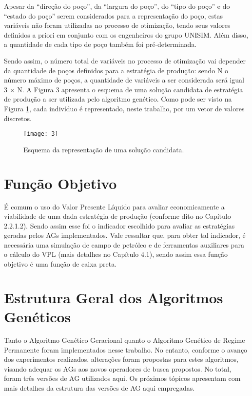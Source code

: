 Apesar da “direção do poço”, da “largura do poço”, do “tipo do poço” e do “estado do poço” serem considerados para a representação do poço, estas variáveis não foram utilizadas no processo de otimização, tendo seus valores definidos a priori em conjunto com os engenheiros do grupo UNISIM. Além disso, a quantidade de cada tipo de poço também foi pré-determinada. 

Sendo assim, o número total de variáveis no processo de otimização vai depender da quantidade de poços definidos para a estratégia de produção: sendo N o número máximo de poços, a quantidade de variáveis a ser considerada será igual 3 $\times$ N. A Figura 3 apresenta o esquema de uma solução candidata de estratégia de produção a ser utilizada pelo algoritmo genético. Como pode ser visto na Figura \ref{fig:fig3_1}, cada indivíduo é representado, neste trabalho, por um vetor de valores discretos.

\begin{figure}[htb]
  \centering
  \texttt{[image: 3]}
  \caption{Esquema da representação de uma solução candidata.}
  \label{fig:fig3_1}
\end{figure}

\section{Função Objetivo}

É comum o uso do Valor Presente Líquido para avaliar economicamente a viabilidade de uma dada estratégia de produção (conforme dito no Capítulo 2.2.1.2). Sendo assim esse foi o indicador escolhido para avaliar as estratégias geradas pelos AGs implementados. Vale ressaltar que, para obter tal indicador, é necessária uma simulação de campo de petróleo e de ferramentas auxiliares para o cálculo do VPL (mais detalhes no Capítulo 4.1), sendo assim essa função objetivo é uma função de caixa preta. 

\section{Estrutura Geral dos Algoritmos Genéticos}

Tanto o Algoritmo Genético Geracional quanto o Algoritmo Genético de Regime Permanente foram implementados nesse trabalho. No entanto, conforme o avanço dos experimentos realizados, alterações foram propostas para estes algoritmos, visando adequar os AGs aos novos operadores de busca propostos.  No total, foram três versões de AG utilizados aqui.  Os próximos tópicos apresentam com mais detalhes da estrutura das versões de AG aqui empregadas.

